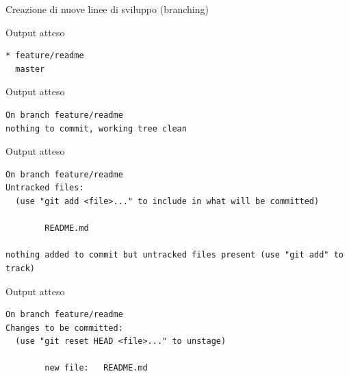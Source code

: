 \documentclass[xcolor=dvipsnames,presentation]{beamer}
\begin{document}
\begin{frame}{Creazione di nuove linee di sviluppo (branching)}
\begin{block}{Output atteso}
        \begin{Verbatim}[fontsize=\scriptsize]
* feature/readme
  master
        \end{Verbatim}
    \end{block}
    \begin{block}{Output atteso}
        \begin{Verbatim}[fontsize=\scriptsize]
On branch feature/readme
nothing to commit, working tree clean
        \end{Verbatim}
    \end{block}
    \begin{block}{Output atteso}
        \begin{Verbatim}[fontsize=\scriptsize]
On branch feature/readme
Untracked files:
  (use "git add <file>..." to include in what will be committed)

        README.md

nothing added to commit but untracked files present (use "git add" to track)
        \end{Verbatim}
    \end{block}
    \begin{block}{Output atteso}
        \begin{Verbatim}[fontsize=\scriptsize]
On branch feature/readme
Changes to be committed:
  (use "git reset HEAD <file>..." to unstage)

        new file:   README.md


\end{Verbatim}
\end{block}
\end{frame}
\end{document}
